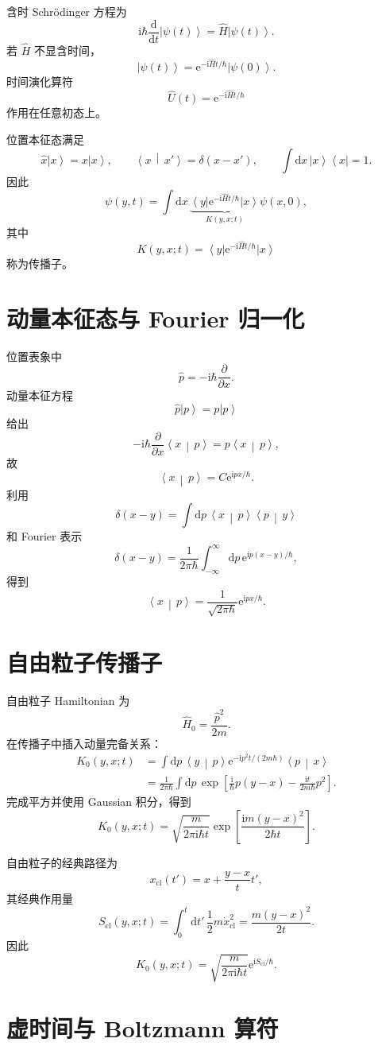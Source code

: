 \documentclass[11pt,a4paper,oneside,openany,fontset=fandol]{ctexbook}
\newcommand{\dd}{\mathrm{d}}
\newcommand{\ee}{\mathrm{e}}
\newcommand{\ii}{\mathrm{i}}
\newcommand{\ket}[1]{\left|#1\right\rangle}
\newcommand{\bra}[1]{\left\langle#1\right|}
\newcommand{\braket}[2]{\left\langle#1\,\middle|\,#2\right\rangle}
\begin{document}
含时 Schrödinger 方程为
\[
\ii\hbar\frac{\dd}{\dd t}\ket{\psi(t)}
=
\hat H\ket{\psi(t)}.
\]
若 $\hat H$ 不显含时间，
\[
\ket{\psi(t)}
=
\ee^{-\ii\hat Ht/\hbar}\ket{\psi(0)}.
\]
时间演化算符
\[
\hat U(t)=\ee^{-\ii\hat Ht/\hbar}
\]
作用在任意初态上。

位置本征态满足
\[
\hat x\ket{x}=x\ket{x},
\qquad
\braket{x}{x'}=\delta(x-x'),
\qquad
\int\dd x\,\ket{x}\bra{x}=1.
\]
因此
\[
\psi(y,t)
=
\int\dd x\,
\underbrace{\bra{y}\ee^{-\ii\hat Ht/\hbar}\ket{x}}_{K(y,x;t)}
\psi(x,0),
\]
其中
\[
K(y,x;t)
=
\bra{y}\ee^{-\ii\hat Ht/\hbar}\ket{x}
\]
称为传播子。

\section{动量本征态与 Fourier 归一化}

位置表象中
\[
\hat p=-\ii\hbar\frac{\partial}{\partial x}.
\]
动量本征方程
\[
\hat p\ket{p}=p\ket{p}
\]
给出
\[
-\ii\hbar\frac{\partial}{\partial x}\braket{x}{p}
=
p\braket{x}{p},
\]
故
\[
\braket{x}{p}=C\ee^{\ii px/\hbar}.
\]
利用
\[
\delta(x-y)
=
\int\dd p\,\braket{x}{p}\braket{p}{y}
\]
和 Fourier 表示
\[
\delta(x-y)
=
\frac{1}{2\pi\hbar}
\int_{-\infty}^{\infty}
\dd p\,
\ee^{\ii p(x-y)/\hbar},
\]
得到
\[
\boxed{
\braket{x}{p}
=
\frac{1}{\sqrt{2\pi\hbar}}
\ee^{\ii px/\hbar}
}.
\]

\section{自由粒子传播子}

自由粒子 Hamiltonian 为
\[
\hat H_0=\frac{\hat p^2}{2m}.
\]
在传播子中插入动量完备关系：
\begin{align}
K_0(y,x;t)
&=
\int\dd p\,
\braket{y}{p}
\ee^{-\ii p^2t/(2m\hbar)}
\braket{p}{x}\\
&=
\frac{1}{2\pi\hbar}
\int\dd p\,
\exp\left[
\frac{\ii}{\hbar}p(y-x)
-\frac{\ii t}{2m\hbar}p^2
\right].
\end{align}
完成平方并使用 Gaussian 积分，得到
\[
\boxed{
K_0(y,x;t)
=
\sqrt{\frac{m}{2\pi\ii\hbar t}}
\exp\left[
\frac{\ii m(y-x)^2}{2\hbar t}
\right]
}.
\]

自由粒子的经典路径为
\[
x_{\mathrm{cl}}(t')
=
x+\frac{y-x}{t}t',
\]
其经典作用量
\[
S_{\mathrm{cl}}(y,x;t)
=
\int_0^t\dd t'\,\frac12m\dot x_{\mathrm{cl}}^2
=
\frac{m(y-x)^2}{2t}.
\]
因此
\[
K_0(y,x;t)
=
\sqrt{\frac{m}{2\pi\ii\hbar t}}
\ee^{\ii S_{\mathrm{cl}}/\hbar}.
\]

\section{虚时间与 Boltzmann 算符}
\end{document}
